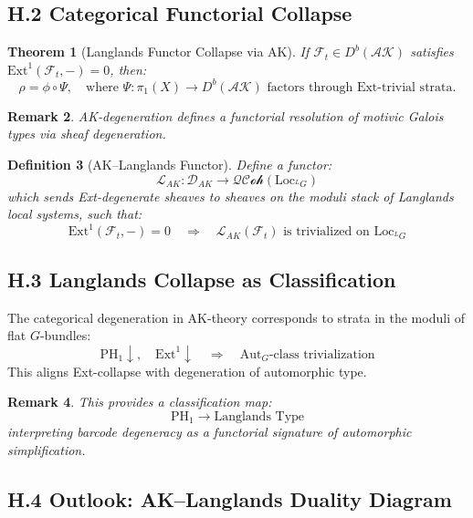\documentclass[11pt]{article}
\newtheorem{theorem}{Theorem}[section]
\newtheorem{definition}[theorem]{Definition}
\newtheorem{remark}[theorem]{Remark}
\begin{document}
\subsection*{H.2 Categorical Functorial Collapse}

\begin{theorem}[Langlands Functor Collapse via AK]
If $\mathcal{F}_t \in D^b(\mathcal{AK})$ satisfies $\mathrm{Ext}^1(\mathcal{F}_t, -) = 0$, then:
\[
\rho = \phi \circ \Psi, \quad \text{where } \Psi: \pi_1(X) \to D^b(\mathcal{AK}) \text{ factors through Ext-trivial strata.}
\]
\end{theorem}

\begin{remark}
AK-degeneration defines a functorial resolution of motivic Galois types via sheaf degeneration.
\end{remark}

\begin{definition}[AK–Langlands Functor]
Define a functor:
\[
\mathcal{L}_{AK} : \mathcal{D}_{AK} \longrightarrow \mathcal{QCoh}(\mathrm{Loc}_{^LG})
\]
which sends Ext-degenerate sheaves to sheaves on the moduli stack of Langlands local systems, such that:
\[
\mathrm{Ext}^1(\mathcal{F}_t, -) = 0 \quad \Rightarrow \quad \mathcal{L}_{AK}(\mathcal{F}_t) \text{ is trivialized on } \mathrm{Loc}_{^LG}
\]
\end{definition}

\subsection*{H.3 Langlands Collapse as Classification}

\begin{proposition}
The categorical degeneration in AK-theory corresponds to strata in the moduli of flat \( G \)-bundles:
\[
\text{PH}_1 \downarrow,\quad \mathrm{Ext}^1 \downarrow \quad \Rightarrow \quad \mathrm{Aut}_G\text{-class trivialization}
\]
This aligns Ext-collapse with degeneration of automorphic type.
\end{proposition}

\begin{remark}
This provides a classification map:
\[
\mathrm{PH}_1 \to \text{Langlands Type}
\]
interpreting barcode degeneracy as a functorial signature of automorphic simplification.
\end{remark}

\subsection*{H.4 Outlook: AK–Langlands Duality Diagram}
\end{document}
